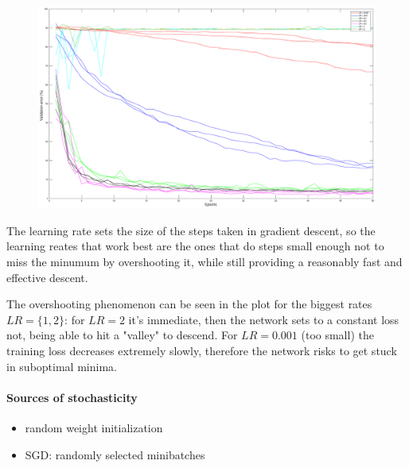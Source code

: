\documentclass{article}
\begin{document}
    \begin{figure}[!htb]
        \centering
        \includegraphics[width=\textwidth]{figures/sc1_val_err}
    \end{figure}
    
    The learning rate sets the size of the steps taken in gradient descent, so the learning reates that work best are the ones that do steps small enough not to miss the minumum by overshooting it,
    while still providing a reasonably fast and effective descent. 
    
    The overshooting phenomenon can be seen in the plot for the biggest rates $LR = \{1,2\}$: for $LR = 2$ it's immediate, then the network sets to a constant loss 
    not, being able to hit a "valley" to descend.
    For $LR = 0.001$ (too small) the training loss decreases extremely slowly, therefore the network risks to get stuck in suboptimal minima.
    
    \paragraph*{Sources of stochasticity}
        \begin{itemize}
        \item random weight initialization
        \item SGD: randomly selected minibatches
        \end{itemize}
    
    
    
    
\end{document}
